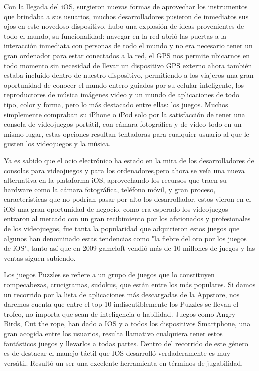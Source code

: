 Con la llegada del iOS, surgieron nuevas formas de aprovechar
los instrumentos que brindaba a sus usuarios, muchos
desarrolladores pusieron de inmediatos sus ojos en este novedoso
dispositivo, hubo una explosión de ideas provenientes de todo el
mundo, su funcionalidad: navegar en la red abrió las puertas a
la interacción inmediata con personas de todo el mundo y no era
necesario tener un gran ordenador para estar conectados a la
red, el GPS nos permite ubicarnos en todo momento sin
necesidad de llevar un dispositivo GPS externo ahora también
estaba incluido dentro de nuestro dispositivo, permitiendo a los
viajeros una gran oportunidad de conocer el mundo entero
guiados por su celular inteligente, los reproductores de música
imágenes video y un mundo de aplicaciones de todo tipo, color y
forma, pero lo más destacado entre ellas: los juegos. Muchos
simplemente compraban su iPhone o iPod solo por la
satisfacción de tener una consola de videojuegos portátil, con
cámara fotográfica y de video todo en un mismo lugar, estas
opciones resultan tentadoras para cualquier usuario al que le
gusten los videojuegos y la música.

Ya es sabido que el ocio electrónico ha estado en la mira de los
desarrolladores de consolas para videojuegos y para los
ordenadores,pero ahora se veía una nueva alternativa en la
plataforma iOS, aprovechando los recursos que traen su
hardware como la cámara fotográfica, teléfono móvil, y gran
proceso, características que no podrían pasar por alto los
desarrollador, estos vieron en el iOS una gran oportunidad de
negocio, como era esperado los videojuegos entraron al mercado
con un gran recibimiento por los aficionados y profesionales de
los videojuegos, fue tanta la popularidad que adquirieron estos
juegos que algunos han denominado estas tendencias como "la
fiebre del oro por los juegos de iOS", tanto así que en 2009
gameloft vendió más de 10 millones de juegos y las ventas
siguen subiendo.

Los juegos Puzzles se refiere a un grupo de juegos que lo
constituyen rompecabezas, crucigramas, sudokus, que están
entre los más populares. Si damos un recorrido por la lista de
aplicaciones más descargadas de la Appstore, nos daremos
cuenta que entre el top 10 indiscutiblemente los Puzzles se
llevan el trofeo, no importa que sean de inteligencia o habilidad.
Juegos como Angry Birds, Cut the rope, han dado a IOS y a
todos los dispositivos Smartphone, una gran acogida entre los
usuarios, resulta llamativo cualquiera tener estos fantásticos
juegos y llevarlos a todas partes. Dentro del recorrido de este
género es de destacar el manejo táctil que IOS desarrolló
verdaderamente es muy versátil. Resultó un ser una excelente
herramienta en términos de jugabilidad.

